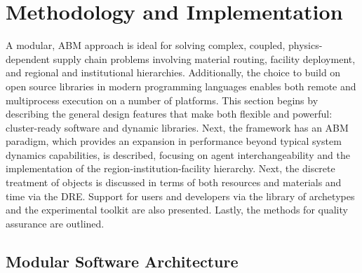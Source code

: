\section{Methodology and Implementation}

A modular, \acrfull{ABM} approach is ideal for solving complex, coupled,
physics-dependent supply chain problems involving material routing, facility
deployment, and regional and institutional hierarchies. Additionally, the choice to
build \Cyclus on open source libraries in modern programming languages enables
both remote and multiprocess execution on a number of platforms. This section begins by
describing the general design features that make \Cyclus both flexible and powerful:
cluster-ready software and dynamic libraries.  Next, the framework has an
\gls{ABM} paradigm, which provides an expansion in performance beyond typical system dynamics
capabilities, is described, focusing on agent interchangeability and the
implementation of the region-institution-facility hierarchy.
Next, the discrete treatment of objects is discussed in terms of both
resources and materials and time via the \gls{DRE}.
Support for users and developers via the \Cycamore library of
archetypes and the experimental toolkit are also presented.
Lastly, the methods for quality assurance are outlined.

\subsection{Modular Software Architecture}

